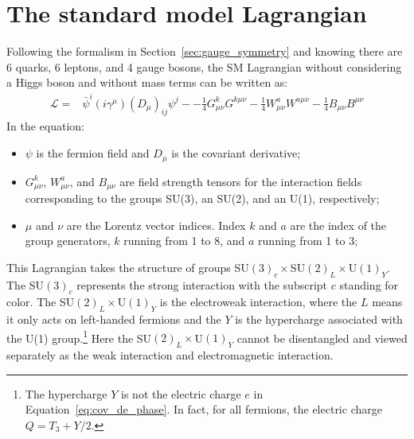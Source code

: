 \section{The standard model Lagrangian}\label{sec:SM_Lagrangian}

Following the formalism in Section~\ref{sec:gauge_symmetry} and knowing there are 6 quarks, 6 leptons, and 4 gauge bosons,
the SM Lagrangian without considering a Higgs boson and without mass terms can be written as:
\begin{equation}\label{eq:SM_Lagrangian}
  \begin{split}
    \mathcal{L} = & \bar{\psi}^{i} (i\gamma^{\mu})(D_{\mu})_{ij}\psi^{j} -
                  - \frac{1}{4} G^{k}_{\mu\nu}G^{k\mu\nu}
                  - \frac{1}{4} W^{a}_{\mu\nu}W^{a\mu\nu}
                  - \frac{1}{4} B_{\mu\nu}B^{\mu\nu}
  \end{split}
\end{equation}
In the equation:
\begin{itemize}
  \item $\psi$ is the fermion field and $D_{\mu}$ is the covariant derivative;
  \item $G^{k}_{\mu\nu}$, $W^{a}_{\mu\nu}$, and $B_{\mu\nu}$ are field strength tensors for the interaction fields 
        corresponding to the groups SU(3), an SU(2), and an U(1), respectively;
  \item $\mu$ and $\nu$ are the Lorentz vector indices. Index $k$ and $a$ are the index of the group generators, $k$ running from 1 to 8, and $a$ running from 1 to 3;
\end{itemize}


This Lagrangian takes the structure of groups SU$(3)_{c} \times$SU$(2)_{L} \times$U$(1)_{Y}$.
The SU$(3)_{c}$ represents the strong interaction with the subscript $c$ standing for color.
The SU$(2)_{L} \times$U$(1)_{Y}$ is the electroweak interaction, 
where the $L$ means it only acts on left-handed fermions
and the $Y$ is the hypercharge associated with the U(1) group.\footnote{The hypercharge $Y$ is not the electric charge $e$ in Equation~\ref{eq:cov_de_phase}.
In fact, for all fermions, the electric charge $Q = T_{3} + Y/2$.}
Here the SU$(2)_{L} \times$U$(1)_{Y}$ cannot be disentangled and viewed separately as the weak interaction and electromagnetic interaction.

